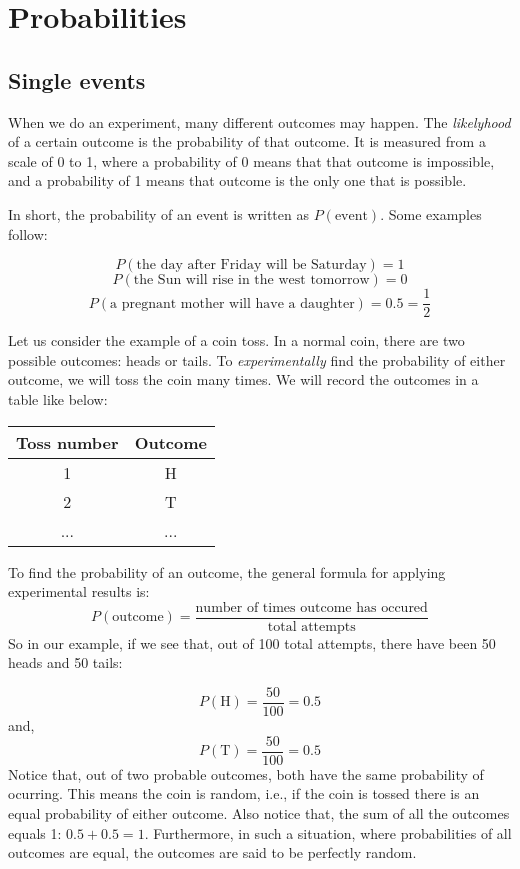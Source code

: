 \documentclass{article}
\begin{document}
\section*{Probabilities}
\subsection*{Single events}
When we do an experiment, many different outcomes may happen. The \textit{likelyhood} of a certain
outcome is the probability of that outcome. It is measured from a scale of 0 to 1, where a 
probability of 0 means that that outcome is impossible, and a probability of 1 means that outcome
is the only one that is possible.

In short,
the probability of an event is written as $P(\textrm{event})$. Some examples follow:

$$ P(\textrm{the day after Friday will be Saturday}) = 1 $$
$$ P(\textrm{the Sun will rise in the west tomorrow}) = 0 $$
$$ P(\textrm{a pregnant mother will have a daughter}) = 0.5 = \frac{1}{2} $$

Let us consider the example of a coin toss. In a normal coin, there are two possible outcomes:
heads or tails. To \textit{experimentally} find the probability of either outcome, we will toss
the coin many times. We will record the outcomes in a table like below:

\begin{center}
	\begin{tabular}{ | c | c | }
		\hline
		Toss number & Outcome \\
		\hline
		1 & H \\
		2 & T \\
		... & ... \\
		\hline
	\end{tabular}
\end{center}

To find the probability of an outcome, the general formula for applying experimental results is:
$$ P(\textrm{outcome}) = \frac{\textrm{number of times outcome has occured}}
{\textrm{total attempts}} $$
So in our example, if we see that, out of 100 total attempts, there have been 50 heads and 50 
tails:

$$ P(\textrm{H}) = \frac{50}{100} = 0.5 $$
and,
$$ P(\textrm{T}) = \frac{50}{100} = 0.5 $$
Notice that, out of two probable outcomes, both have the same probability of ocurring. This means
the coin is random, i.e., if the coin is tossed there is an equal probability of either outcome.
Also notice that, the sum of all the outcomes equals 1: $0.5 + 0.5 = 1$. Furthermore, in such a
situation, where probabilities of all outcomes are equal, the outcomes are said to be perfectly
random.
\end{document}
